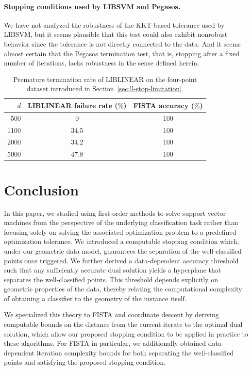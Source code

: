 \documentclass[twoside,11pt]{article}
\begin{document}
\paragraph{Stopping conditions used by LIBSVM and Pegasos.}
We have not analyzed the robustness of the KKT-based tolerance used by LIBSVM, but it seems plausible that this test could also exhibit nonrobust behavior since the tolerance is not directly connected to the data.  And it seems almost certain that the Pegasos termination test, that is, stopping after a fixed number of iterations, lacks robustness in the sense defined herein.

\begin{table}[t]
\caption{Premature termination rate of LIBLINEAR on the four-point dataset introduced in Section~\ref{sec:ll-stop-limitation}.}
\label{tab:premature-stopping}
\centering
\small
\setlength{\tabcolsep}{10pt}
\renewcommand{\arraystretch}{1.15}

\begin{tabular}{rcc}
\toprule
$d$ & LIBLINEAR failure rate ($\%$) & FISTA accuracy ($\%$) \\
\midrule
500  & 0 & 100\\
1100 & 34.5 & 100\\
2000 & 34.2 & 100\\
5000 & 47.8 & 100\\
\bottomrule
\end{tabular}
\end{table}

\section{Conclusion}
In this paper, we studied using first-order methods to solve support vector machines from the perspective of the underlying classification task rather than focusing solely on solving the associated optimization problem to a predefined optimization tolerance. We introduced a computable stopping condition which, under our geometric data model, guarantees the separation of the well-classified points once triggered. We further derived a data-dependent accuracy threshold such that any sufficiently accurate dual solution yields a hyperplane that separates the well-classified points. This threshold depends explicitly on geometric properties of the data, thereby relating the computational complexity of obtaining a classifier to the geometry of the instance itself. 

We specialized this theory to FISTA and coordinate descent by deriving computable bounds on the distance from the current iterate to the optimal dual solution, which allow our proposed stopping condition to be applied in practice to these algorithms. For FISTA in particular, we additionally obtained data-dependent iteration complexity bounds for both separating the well-classified points and satisfying the proposed stopping condition.
\end{document}
